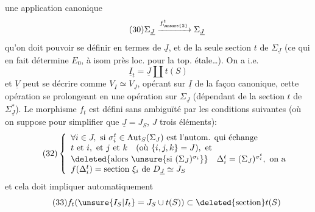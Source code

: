 une application canonique
\[
\tag{30}\Sigma_{\underline J}\xrightarrow{f_{\unsure{2}}^t}\Sigma_{\underline J}
\]
qu'on doit pouvoir se définir en termes de $\underline J$, et de la seule section $t$ de $\Sigma_{\underline J}$ (ce qui en fait détermine $E_0$, à isom  près loc. pour la top. étale\ldots). On a i.e.
\[
\tag{31}\underline I_t=\underline J\amalg t(S)
\]
et  $\underline V$ peut se décrire comme $V_{\underline I}\simeq V_{\underline J}$, opérant sur $\underline I$ de la façon canonique, cette opération se prolongeant en une opération sur $\Sigma_{\underline J}$ (dépendant de la section $t$ de $\Sigma_{\underline J}^*$). Le  morphisme $f_t$ est défini sans ambiguïté par les conditions suivantes (où on suppose pour simplifier que $\underline J=J_S$, $J$   trois éléments):
\[
\tag{32}\left\{\begin{array}{l}
\forall i\in J,\ \text{si }\sigma_i^t\in\operatorname{Aut}_S(\Sigma_J)\text{ est l'autom. qui échange}\\
t\text{ et }i,\text{ et }j\text{ et }k\quad(\text{où }\{i,j,k\}=J),\text{ et}\\
\deleted{\text{alors }\unsure{\text{si }(\Sigma_J)^{\sigma_i}}}\quad\Delta_i^t=(\Sigma_J)^{\sigma_i^t},\text{ on a}\\
f(\Delta_i^t)=\text{section }\xi_i\text{ de }D_{\underline J}\simeq J_S
\end{array}\right.
\]
et cela doit impliquer automatiquement
\[
\tag{33}f_t(\unsure{I_S|I_t}=J_S\cup t(S))\subset\deleted{\text{section}}t(S)
\]
